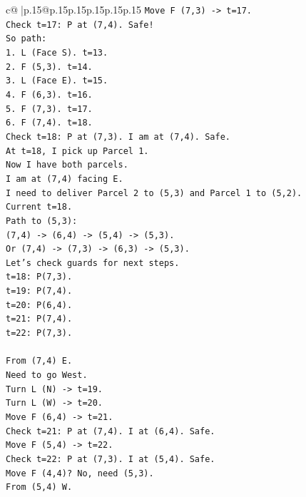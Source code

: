 \documentclass{article}
\begin{document}
{\begin{supertabular}{c@{$\;$}|p{.15\linewidth}@{}p{.15\linewidth}p{.15\linewidth}p{.15\linewidth}p{.15\linewidth}p{.15\linewidth}}
{{{\texttt{Move F (7,3) {-}> t=17.} \\
\texttt{Check t=17: P at (7,4). Safe!} \\
\texttt{So path:} \\
\texttt{1. L (Face S). t=13.} \\
\texttt{2. F (5,3). t=14.} \\
\texttt{3. L (Face E). t=15.} \\
\texttt{4. F (6,3). t=16.} \\
\texttt{5. F (7,3). t=17.} \\
\texttt{6. F (7,4). t=18.} \\
\texttt{Check t=18: P at (7,3). I am at (7,4). Safe.} \\
\texttt{At t=18, I pick up Parcel 1.} \\
\texttt{Now I have both parcels.} \\
\texttt{I am at (7,4) facing E.} \\
\texttt{I need to deliver Parcel 2 to (5,3) and Parcel 1 to (5,2).} \\
\texttt{Current t=18.} \\
\texttt{Path to (5,3):} \\
\texttt{(7,4) {-}> (6,4) {-}> (5,4) {-}> (5,3).} \\
\texttt{Or (7,4) {-}> (7,3) {-}> (6,3) {-}> (5,3).} \\
\texttt{Let's check guards for next steps.} \\
\texttt{t=18: P(7,3).} \\
\texttt{t=19: P(7,4).} \\
\texttt{t=20: P(6,4).} \\
\texttt{t=21: P(7,4).} \\
\texttt{t=22: P(7,3).} \\
\\ 
\texttt{From (7,4) E.} \\
\texttt{Need to go West.} \\
\texttt{Turn L (N) {-}> t=19.} \\
\texttt{Turn L (W) {-}> t=20.} \\
\texttt{Move F (6,4) {-}> t=21.} \\
\texttt{Check t=21: P at (7,4). I at (6,4). Safe.} \\
\texttt{Move F (5,4) {-}> t=22.} \\
\texttt{Check t=22: P at (7,3). I at (5,4). Safe.} \\
\texttt{Move F (4,4)? No, need (5,3).} \\
\texttt{From (5,4) W.} \\
}}}
\end{supertabular}}
\end{document}
